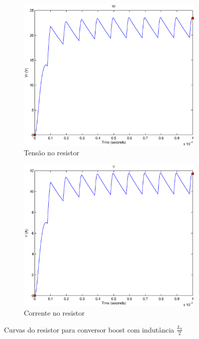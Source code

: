 \documentclass{article}
\begin{document}
\begin{figure}[H]
	\centering
	\begin{subfigure}[b]{0.4\linewidth}
		\includegraphics[width=\linewidth]{matlab/boost/b_vr2}
		\caption{Tensão no resistor}
	\end{subfigure}
	\begin{subfigure}[b]{0.4\linewidth}
		\centering
		\includegraphics[width=\linewidth]{matlab/boost/b_ir2}
		\caption{Corrente no resistor}
	\end{subfigure}
	\caption{Curvas do resistor para conversor boost com indutância $\frac{L_b}{2}$}
	\label{fig:bor2}
\end{figure}
\end{document}
